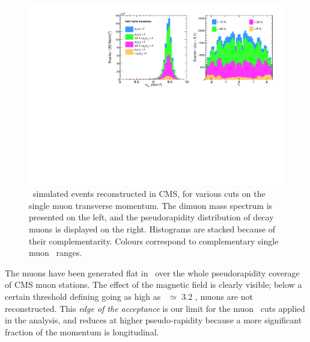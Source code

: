 \begin{figure}[h]
\begin{center}
\includegraphics[width=\textwidth]{Chapters/aYield/MCtries.pdf}
\caption{\PgUa\ simulated events reconstructed in CMS, for various cuts on the
      single muon transverse momentum. The dimuon mass spectrum is
      presented on the left, and the pseudorapidity distribution of
      decay muons is displayed on the right. Histograms are stacked because
      of their complementarity. Colours
      correspond to complementary single muon \pt\ ranges.}
\label{fig:MCtries}
\end{center}
\end{figure}

The muons have been generated flat in \pt\ over the whole
pseudorapidity coverage of CMS muon stations. The effect of the
magnetic field is clearly visible; below a certain threshold defining
going as high as \pt\ $\simeq$ 3.2 \GeVc, muons are not reconstructed.
This \textit{edge of the acceptance} is our limit for the muon \pt\ cuts
applied in the analysis, and reduces at higher pseudo-rapidity
because a more significant fraction of the momentum is longitudinal.

